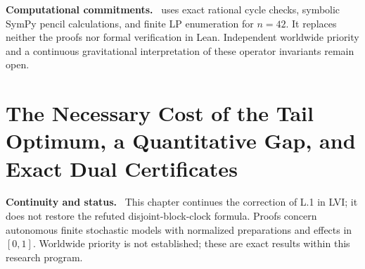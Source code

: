 \documentclass[11pt,a4paper,oneside]{book}
\newcommand{\note}[1]{\par\medskip\noindent\textbf{#1}\ }
\begin{document}
\note{Computational commitments.}  uses exact rational cycle checks, symbolic SymPy pencil calculations, and finite LP enumeration for $n=42$. It replaces neither the proofs nor formal verification in Lean. Independent worldwide priority and a continuous gravitational interpretation of these operator invariants remain open.
\setcounter{equation}{349}


\chapter{The Necessary Cost of the Tail Optimum, a Quantitative Gap, and Exact Dual Certificates}
\note{Continuity and status.} This chapter continues the correction of L.1 in LVI; it does not restore the refuted disjoint-block-clock formula. Proofs concern autonomous finite stochastic models with normalized preparations and effects in $[0,1]$. Worldwide priority is not established; these are exact results within this research program.
\end{document}
